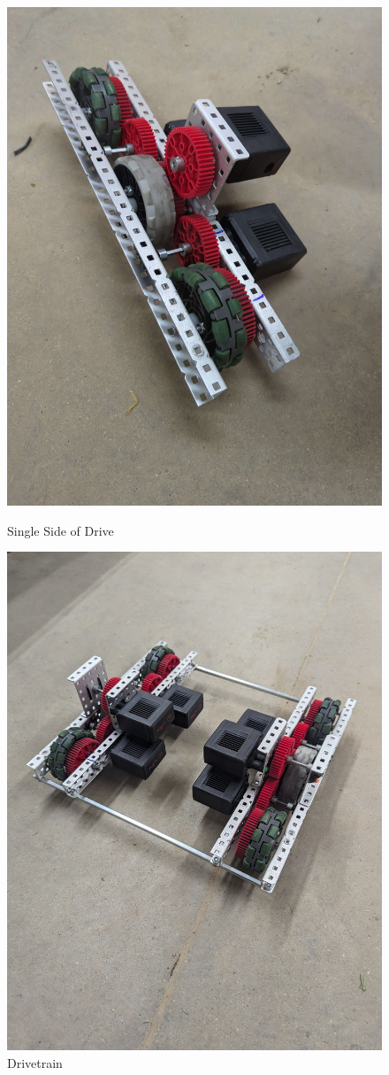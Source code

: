 \begin{figure} [hbt!]
    \begin{minipage}{.5\textwidth}
        \centering
        \includegraphics[width=.8\linewidth]{images/Full Drive.jpg}
        \caption{Single Side of Drive}
        \label{fig:side-of-drive}
    \end{minipage}
     \begin{minipage}{.5\textwidth}
        \centering
        \includegraphics[width=.8\linewidth]{images/Drivetrain.jpg}
        \caption{Drivetrain}
        \label{fig:drivetrain}
    \end{minipage}
\end{figure}
